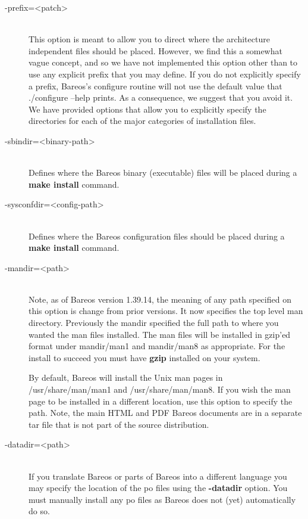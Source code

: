 \begin{description}
\item [ \--prefix={\textless}patch{\textgreater}] \hfill \\
This option is meant to allow you to direct where the architecture
independent files should be placed.  However, we find this a somewhat
vague concept, and so we have not implemented this option other than
to use any explicit prefix that you may define.  If you do not
explicitly specify a prefix, Bareos's configure routine will not use
the default value that ./configure --help prints.
As a consequence, we suggest that
you avoid it. We have provided options that allow you to explicitly
specify the directories for each of the major categories of installation
files.

\item [ {-}{\-}sbindir={\textless}binary-path{\textgreater}] \hfill \\
Defines where the Bareos  binary (executable) files will be placed during a
{\bf make  install} command.

\item [ {-}{\-}sysconfdir={\textless}config-path{\textgreater}] \hfill \\
Defines where the Bareos configuration files should be placed during a
{\bf make install} command.

\item [ {-}{\-}mandir={\textless}path{\textgreater}] \hfill \\
Note, as of Bareos version 1.39.14, the meaning of any path
specified on this option is change from prior versions. It
now specifies the top level man directory.
Previously the mandir specified the full path to where you
wanted the man files installed.
The man files will be installed in gzip'ed format under
mandir/man1 and mandir/man8 as appropriate.
For the install to succeed you must have {\bf gzip} installed
on your system.

By default, Bareos will install the Unix man pages in
/usr/share/man/man1 and /usr/share/man/man8.
If you wish the man page to be installed in
a different location, use this option to specify the path.
Note, the main HTML and PDF Bareos documents are in a separate
tar file that is not part of the source distribution.

\item [ {-}{\-}datadir={\textless}path{\textgreater}] \hfill \\
If you translate Bareos or parts of Bareos into a different language
you may specify the location of the po files using the {\bf
{-}{\-}datadir} option. You must manually install any po files as
Bareos does not (yet) automatically do so.


\end{description}
